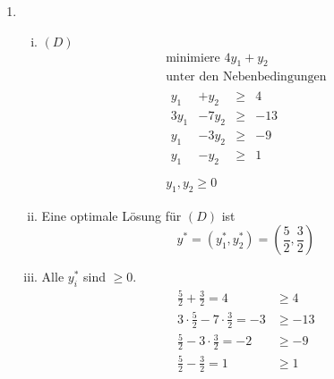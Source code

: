 \documentclass[a4paper]{scrartcl}
\begin{document}
\begin{enumerate}[label=\bfseries\arabic*.]
\begin{enumerate}
\begin{enumerate}[(i)]
\begin{enumerate}
\begin{itemize}
                                \end{itemize}
                        \end{enumerate}
                        

                \end{enumerate}

            \item
                \begin{enumerate}[(i)]
                    \item $(D)$
                        \begin{equation}
                            \begin{gathered}
                                \text{minimiere } 4y_1 +y_2 \\
                                \text{unter den Nebenbedingungen} \\
                                \begin{array}{rrcr}
                                    y_1 & +y_2 & \geq & 4 \\
                                    3y_1 & -7y_2 & \geq & -13 \\
                                    y_1 & -3y_2 & \geq & -9 \\
                                    y_1 & -y_2 & \geq & 1 \\
                                \end{array} \\
                                y_1, y_2 \geq 0
                            \end{gathered}
                        \end{equation}

                    \item
                        Eine optimale Lösung für $(D)$ ist
                        \begin{equation}
                            y^* = \left( y_1^*, y_2^* \right)
                            = \left( \frac{5}{2}, \frac{3}{2}  \right)
                        \end{equation}

                    \item
                        Alle $y_i^*$ sind $\geq 0$.
                        \begin{align}
                            \frac{5}{2} + \frac{3}{2} = 4 &\geq 4 \\
                            3 \cdot \frac{5}{2} - 7 \cdot \frac{3}{2} = -3 &\geq -13 \\
                            \frac{5}{2} - 3 \cdot \frac{3}{2} = -2 &\geq -9 \\
                            \frac{5}{2} - \frac{3}{2} = 1 &\geq 1
                        \end{align}
                        

\end{enumerate}
\end{enumerate}
\end{enumerate}
\end{document}
